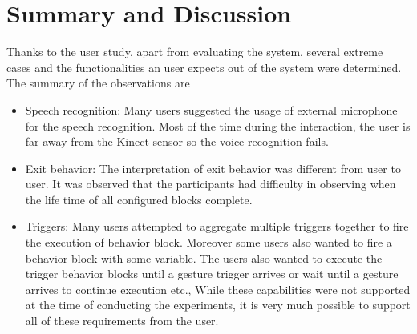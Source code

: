 \section{Summary and Discussion}
Thanks to the user study, apart from evaluating the system, several extreme cases and the functionalities an user expects out of the system were determined. The summary of the observations are
\begin{itemize}
\item Speech recognition: Many users suggested the usage of external microphone for the speech recognition. Most of the time during the interaction, the user is far away from the Kinect sensor so the voice recognition fails.
\item Exit behavior: The interpretation of exit behavior was different from user to user. It was observed that the participants had difficulty in observing when the life time of all configured blocks complete.
\item Triggers: Many users attempted to aggregate multiple triggers together to fire the execution of behavior block. Moreover some users also wanted to fire a behavior block with some variable. The users also wanted to execute the trigger behavior blocks until a gesture trigger arrives or wait until a gesture arrives to continue execution etc., While these capabilities were not supported at the time of conducting the experiments, it is very much possible to support all of these requirements from the user.
\end{itemize}